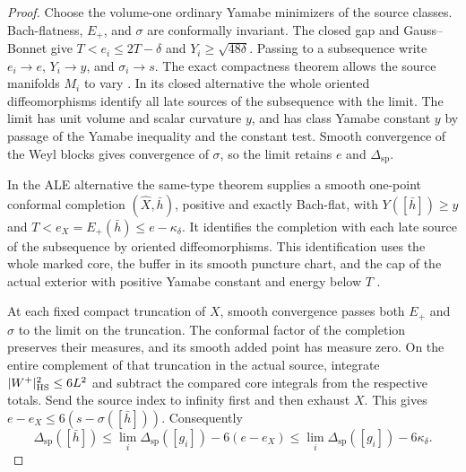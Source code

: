 \begin{proof}
Choose the volume-one ordinary Yamabe minimizers of the source
classes. Bach-flatness, \(E_+\), and \(\sigma\) are conformally
invariant. The closed gap and Gauss--Bonnet give
\(T<e_i\le2T-\delta\) and \(Y_i\ge\sqrt{48\delta}\). Passing
to a subsequence write \(e_i\to e\), \(Y_i\to y\), and
\(\sigma_i\to s\). The exact compactness theorem allows the
source manifolds \(M_i\) to vary
\cite[Exact compactness]{Baker2026MarkedNecks}.
In its closed alternative the whole oriented diffeomorphisms
identify all late sources of the subsequence with the limit.
The limit has unit volume and scalar curvature \(y\), and has
class Yamabe constant \(y\) by passage of the Yamabe inequality
and the constant test. Smooth convergence of the Weyl blocks
gives convergence of \(\sigma\), so the limit retains \(e\) and
\(\Delta_{\mathrm{sp}}\).

In the ALE alternative the same-type theorem supplies a smooth
one-point conformal completion \((\widehat X,\bar h)\), positive
and exactly Bach-flat, with \(Y([\bar h])\ge y\) and
\(T<e_X=E_+(\bar h)\le e-\kappa_\delta\). It identifies the
completion with each late source of the subsequence by oriented
diffeomorphisms. This identification uses the whole marked core,
the buffer in its smooth puncture chart, and the cap of the actual
exterior with positive Yamabe constant and energy below \(T\)
\cite[Finite ordinary punctures and Same-type descent]{Baker2026MarkedNecks}.

At each fixed compact truncation of \(X\), smooth convergence
passes both \(E_+\) and \(\sigma\) to the limit on the truncation.
The conformal factor of the completion preserves their measures,
and its smooth added point has measure zero. On the entire
complement of that truncation in the actual source, integrate
\(|W^+|_{\rm HS}^2\le6L^2\) and subtract the compared core
integrals from the respective totals. Send the source index to
infinity first and then exhaust \(X\). This gives
\(e-e_X\le6(s-\sigma([\bar h]))\). Consequently
\begin{equation}\label{eq:exact-spectral-drop}
 \Delta_{\mathrm{sp}}([\bar h])
 \le \lim_i\Delta_{\mathrm{sp}}([g_i])-6(e-e_X)
 \le \lim_i\Delta_{\mathrm{sp}}([g_i])-6\kappa_\delta.
\end{equation}


\end{proof}
